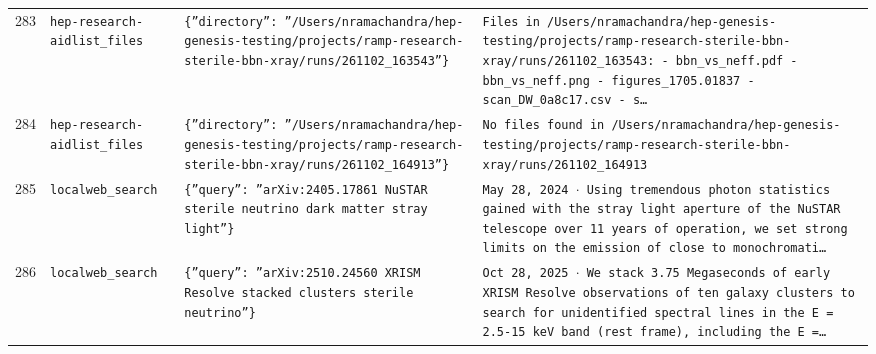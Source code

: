 \documentclass[11pt,a4paper]{article}
\begin{document}
\begin{longtable}{@{}p{}p{}p{}p{}@{}}
283 & \texttt{hep-research-aid}\newline\texttt{list\_\allowbreak{}files} & \texttt{\{''directory'':\allowbreak{} ''/\allowbreak{}Users/\allowbreak{}nramachandra/\allowbreak{}hep-genesis-testing/\allowbreak{}projects/\allowbreak{}ramp-research-sterile-bbn-xray/\allowbreak{}runs/\allowbreak{}261102\_\allowbreak{}163543''\}\allowbreak{}} & \texttt{Files in /\allowbreak{}Users/\allowbreak{}nramachandra/\allowbreak{}hep-genesis-testing/\allowbreak{}projects/\allowbreak{}ramp-research-sterile-bbn-xray/\allowbreak{}runs/\allowbreak{}261102\_\allowbreak{}163543:\allowbreak{}   - bbn\_\allowbreak{}vs\_\allowbreak{}neff.pdf   - bbn\_\allowbreak{}vs\_\allowbreak{}neff.png   - figures\_\allowbreak{}1705.01837   - scan\_\allowbreak{}DW\_\allowbreak{}0a8c17.csv   - s\ldots{}\allowbreak{}} \\
284 & \texttt{hep-research-aid}\newline\texttt{list\_\allowbreak{}files} & \texttt{\{''directory'':\allowbreak{} ''/\allowbreak{}Users/\allowbreak{}nramachandra/\allowbreak{}hep-genesis-testing/\allowbreak{}projects/\allowbreak{}ramp-research-sterile-bbn-xray/\allowbreak{}runs/\allowbreak{}261102\_\allowbreak{}164913''\}\allowbreak{}} & \texttt{No files found in /\allowbreak{}Users/\allowbreak{}nramachandra/\allowbreak{}hep-genesis-testing/\allowbreak{}projects/\allowbreak{}ramp-research-sterile-bbn-xray/\allowbreak{}runs/\allowbreak{}261102\_\allowbreak{}164913} \\
285 & \texttt{local}\newline\texttt{web\_\allowbreak{}search} & \texttt{\{''query'':\allowbreak{} ''arXiv:\allowbreak{}2405.17861 NuSTAR sterile neutrino dark matter stray light''\}\allowbreak{}} & \texttt{May 28,\allowbreak{} 2024 $\cdot$ Using tremendous photon statistics gained with the stray light aperture of the NuSTAR telescope over 11 years of operation,\allowbreak{} we set strong limits on the emission of close to monochromati\ldots{}\allowbreak{}} \\
286 & \texttt{local}\newline\texttt{web\_\allowbreak{}search} & \texttt{\{''query'':\allowbreak{} ''arXiv:\allowbreak{}2510.24560 XRISM Resolve stacked clusters sterile neutrino''\}\allowbreak{}} & \texttt{Oct 28,\allowbreak{} 2025 $\cdot$ We stack 3.75 Megaseconds of early XRISM Resolve observations of ten galaxy clusters to search for unidentified spectral lines in the E =\allowbreak{} 2.5-15 keV band (rest frame)\allowbreak{},\allowbreak{} including the E =\allowbreak{}\ldots{}\allowbreak{}} \\

\end{longtable}
\end{document}
